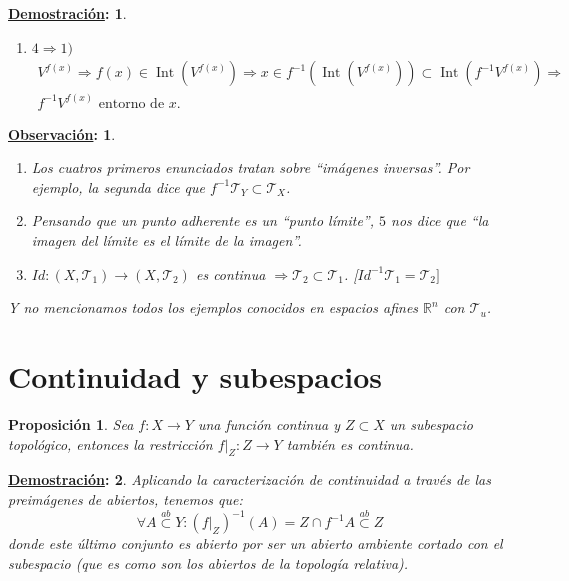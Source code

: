 \documentclass[10pt,a4paper,openright]{book}
\theoremstyle{break}
\newtheorem*{prop}{Proposición}
\newtheorem*{demo}{\underline{Demostración}:}
\newtheorem*{obs}{\underline{Observación}:}
\DeclareMathOperator{\inter}{Int}
\begin{document}
\begin{demo}
\begin{enumerate}
    \item $4 \Rightarrow 1)$
    \begin{gather*}
        V^{f\left( x \right)} \Rightarrow f\left( x \right) \in \inter\left( V^{f\left( x \right)} \right) \Rightarrow x \in f^{-1}\left( \inter\left( V^{f\left( x \right)} \right) \right) \subset \inter\left( f^{-1}V^{f\left( x \right)} \right) \Rightarrow \\
        f^{-1}V^{f\left( x \right) } \text{ entorno de } x.
    \end{gather*}
\end{enumerate}
\end{demo}

\begin{obs}
\begin{enumerate}
    \item Los cuatros primeros enunciados tratan sobre ``imágenes inversas''. Por ejemplo, la segunda dice que $f^{-1}\mathcal{T}_Y \subset \mathcal{T}_X$.
    \item Pensando que un punto adherente es un ``punto límite'', $5$ nos dice que ``la imagen del límite es el límite de la imagen''.
    \item $Id: \left( X, \mathcal{T}_1 \right) \rightarrow \left( X, \mathcal{T}_2 \right)$ es continua $\Rightarrow \mathcal{T}_2 \subset \mathcal{T}_1$. [$Id^{-1}\mathcal{T}_1 = \mathcal{T}_2]$
\end{enumerate}
Y no mencionamos todos los ejemplos conocidos en espacios afines $\mathbb{R}^n$ con $\mathcal{T}_u$.
\end{obs}

\section{Continuidad y subespacios}%
\label{sec:continuidad_y_subespacios}
\begin{prop}
Sea $f: X \rightarrow Y$ una función continua y $Z \subset X$ un subespacio topológico, entonces la restricción $f|_Z : Z \rightarrow Y$ también es continua.
\end{prop}
\begin{demo}
Aplicando la caracterización de continuidad a través de las preimágenes de abiertos, tenemos que:
\[
\forall A \stackrel{ab}{\subset} Y : \left( f|_Z \right)^{-1} \left( A \right) = Z \cap f^{-1} A \stackrel{ab}{\subset} Z
\]
donde este último conjunto es abierto por ser un abierto ambiente cortado con el subespacio (que es como son los abiertos de la topología relativa).
\end{demo}
\end{document}
